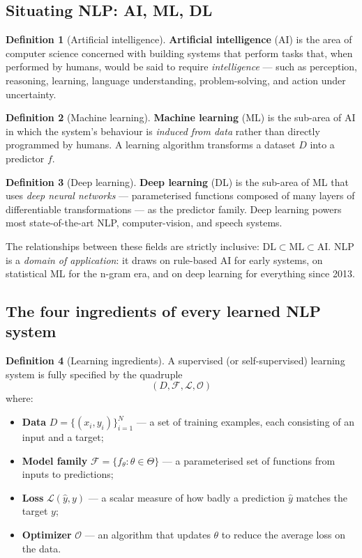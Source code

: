 \documentclass[12pt,a4paper]{report}
\theoremstyle{definition}
\newtheorem{definition}{Definition}[section]
\theoremstyle{remark}
\begin{document}
\subsection{Situating NLP: AI, ML, DL}

\begin{definition}[Artificial intelligence]
\textbf{Artificial intelligence} (AI) is the area of computer science concerned with building systems that perform tasks that, when performed by humans, would be said to require \emph{intelligence} --- such as perception, reasoning, learning, language understanding, problem-solving, and action under uncertainty.
\end{definition}

\begin{definition}[Machine learning]
\textbf{Machine learning} (ML) is the sub-area of AI in which the system's behaviour is \emph{induced from data} rather than directly programmed by humans. A learning algorithm transforms a dataset $D$ into a predictor $f$.
\end{definition}

\begin{definition}[Deep learning]
\textbf{Deep learning} (DL) is the sub-area of ML that uses \emph{deep neural networks} --- parameterised functions composed of many layers of differentiable transformations --- as the predictor family. Deep learning powers most state-of-the-art NLP, computer-vision, and speech systems.
\end{definition}

The relationships between these fields are strictly inclusive: $\mathrm{DL} \subset \mathrm{ML} \subset \mathrm{AI}$. NLP is a \emph{domain of application}: it draws on rule-based AI for early systems, on statistical ML for the n-gram era, and on deep learning for everything since 2013.

\subsection{The four ingredients of every learned NLP system}

\begin{definition}[Learning ingredients]
A supervised (or self-supervised) learning system is fully specified by the quadruple
\[ (D, \mathcal{F}, \mathcal{L}, \mathcal{O}) \]
where:
\begin{itemize}
    \item \textbf{Data} $D = \{(x_i, y_i)\}_{i=1}^N$ --- a set of training examples, each consisting of an input and a target;
    \item \textbf{Model family} $\mathcal{F} = \{f_\theta : \theta \in \Theta\}$ --- a parameterised set of functions from inputs to predictions;
    \item \textbf{Loss} $\mathcal{L}(\hat{y}, y)$ --- a scalar measure of how badly a prediction $\hat{y}$ matches the target $y$;
    \item \textbf{Optimizer} $\mathcal{O}$ --- an algorithm that updates $\theta$ to reduce the average loss on the data.
\end{itemize}
\end{definition}
\end{document}
